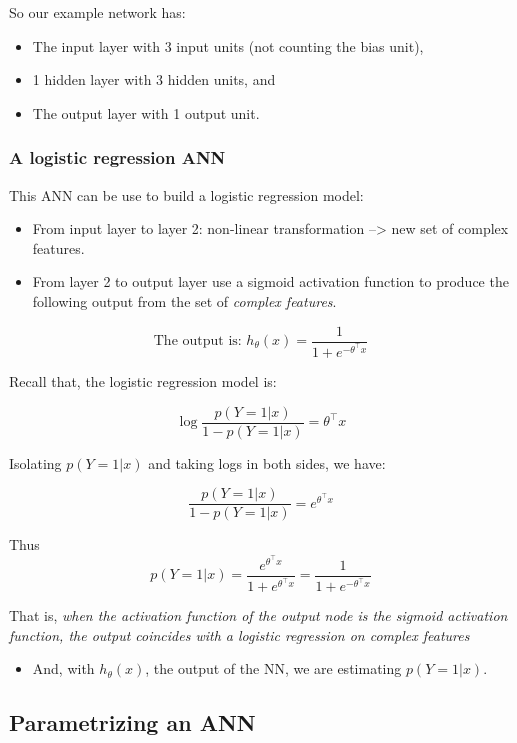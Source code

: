 \documentclass[
  letterpaper,
  DIV=11,
  numbers=noendperiod,
  oneside]{scrartcl}
\providecommand{\tightlist}{%
  \setlength{\itemsep}{0pt}\setlength{\parskip}{0pt}}\usepackage{longtable,booktabs,array}
\begin{document}
So our example network has:

\begin{itemize}
\tightlist
\item
  The input layer with 3 input units (not counting the bias unit),
\item
  1 hidden layer with 3 hidden units, and
\item
  The output layer with 1 output unit.
\end{itemize}

\hypertarget{a-logistic-regression-ann}{%
\subsubsection{A logistic regression
ANN}\label{a-logistic-regression-ann}}

This ANN can be use to build a logistic regression model:

\begin{itemize}
\item
  From input layer to layer 2: non-linear transformation
  --\textgreater{} new set of complex features.
\item
  From layer 2 to output layer use a sigmoid activation function to
  produce the following output from the set of \emph{complex features}.
\end{itemize}

\[
\mbox{The output is: }h_{\theta}(x)=\frac{1}{1+e^{-\theta^\intercal x}}
\]

Recall that, the logistic regression model is:

\[
\log\frac{p(Y=1|x)}{1-p(Y=1|x)}=\theta^\intercal x
\]

Isolating \(p(Y=1|x)\) and taking logs in both sides, we have:

\[
\frac{p(Y=1|x)}{1-p(Y=1|x)}=e^{\theta^\intercal x}
\]

Thus \[
p(Y=1|x)=\frac{e^{\theta^\intercal x}}{1+e^{\theta^\intercal x}}=\frac{1}{1+e^{-\theta^\intercal x}}
\]

That is, \emph{when the activation function of the output node is the
sigmoid activation function, the output coincides with a logistic
regression on complex features}

\begin{itemize}
\tightlist
\item
  And, with \(h_{\theta}(x)\), the output of the NN, we are estimating
  \(p(Y=1|x)\).
\end{itemize}

\hypertarget{parametrizing-an-ann}{%
\subsection{Parametrizing an ANN}\label{parametrizing-an-ann}}
\end{document}
